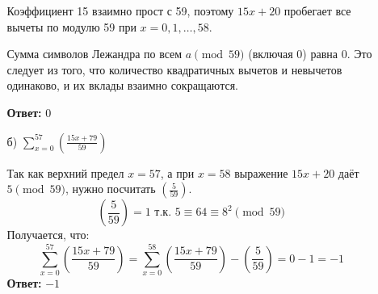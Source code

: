 \documentclass[a4paper]{article}
\begin{document}
\begin{enumerate}
\begin{enumerate}
        Коэффициент 15 взаимно прост с 59, поэтому \(15x + 20\) 
        пробегает все вычеты по модулю 59 при \(x = 0, 1, \dots, 58\).

        Сумма символов Лежандра по всем \(a \pmod{59}\) (включая 0) равна 0. Это следует из того, что количество квадратичных вычетов и невычетов одинаково, и их вклады взаимно сокращаются.  

        \textbf{Ответ: } $0$\\

        \item[б)]\(\sum_{x=0}^{57} \left( \frac{15x+79}{59} \right)\)
        
        Так как верхний предел \(x = 57\), а при \(x = 58\) выражение \(15x + 20\)
         даёт \(5 \pmod{59}\), нужно посчитать $\left( \frac{5}{59} \right)$.
        \[
        \left( \frac{5}{59} \right) = 1 \text{ т.к. \(5 \equiv 64 \equiv 8^2 \pmod{59}\)}
        \]  
        Получается, что:
        \[\sum_{x=0}^{57} \left( \frac{15x+79}{59} \right) =
        \sum_{x=0}^{58}\left( \frac{15x+79}{59} \right) - \left( \frac{5}{59} \right) = 
        0-1 = -1\]
        \textbf{Ответ:} $-1$
    \end{enumerate}
\end{enumerate}
\end{document}
